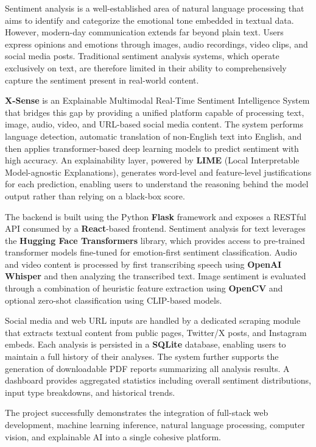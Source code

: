 \documentclass[12pt, a4paper]{report}
\begin{document}
Sentiment analysis is a well-established area of natural language processing that aims to identify and categorize the emotional tone embedded in textual data. However, modern-day communication extends far beyond plain text. Users express opinions and emotions through images, audio recordings, video clips, and social media posts. Traditional sentiment analysis systems, which operate exclusively on text, are therefore limited in their ability to comprehensively capture the sentiment present in real-world content.

\textbf{X-Sense} is an Explainable Multimodal Real-Time Sentiment Intelligence System that bridges this gap by providing a unified platform capable of processing text, image, audio, video, and URL-based social media content. The system performs language detection, automatic translation of non-English text into English, and then applies transformer-based deep learning models to predict sentiment with high accuracy. An explainability layer, powered by \textbf{LIME} (Local Interpretable Model-agnostic Explanations), generates word-level and feature-level justifications for each prediction, enabling users to understand the reasoning behind the model output rather than relying on a black-box score.

The backend is built using the Python \textbf{Flask} framework and exposes a RESTful API consumed by a \textbf{React}-based frontend. Sentiment analysis for text leverages the \textbf{Hugging Face Transformers} library, which provides access to pre-trained transformer models fine-tuned for emotion-first sentiment classification. Audio and video content is processed by first transcribing speech using \textbf{OpenAI Whisper} and then analyzing the transcribed text. Image sentiment is evaluated through a combination of heuristic feature extraction using \textbf{OpenCV} and optional zero-shot classification using CLIP-based models.

Social media and web URL inputs are handled by a dedicated scraping module that extracts textual content from public pages, Twitter/X posts, and Instagram embeds. Each analysis is persisted in a \textbf{SQLite} database, enabling users to maintain a full history of their analyses. The system further supports the generation of downloadable PDF reports summarizing all analysis results. A dashboard provides aggregated statistics including overall sentiment distributions, input type breakdowns, and historical trends.

The project successfully demonstrates the integration of full-stack web development, machine learning inference, natural language processing, computer vision, and explainable AI into a single cohesive platform.
\end{document}

